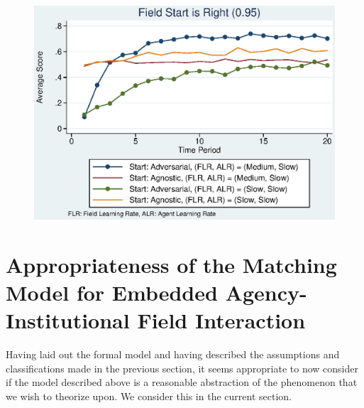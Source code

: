 \documentclass[12pt]{article}
\begin{document}
\begin{figure}[h]
\begin{centering}
  \includegraphics[width=\textwidth]{frcmedium3b}
  \caption{}
  \label{fig:3b}
\end{centering}
\end{figure}

\section{Appropriateness of the Matching Model for Embedded Agency-Institutional Field Interaction}
\noindent Having laid out the formal model and having described the assumptions and classifications made in the previous section, it seems appropriate to now consider if the model described above is a reasonable abstraction of the phenomenon that we wish to theorize upon. We consider this in the current section.\\\\
\end{document}
